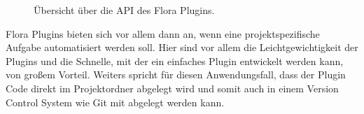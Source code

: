 \begin{figure}
    \centering
    \caption{Übersicht über die API des Flora Plugins.}
    \label{fig:FloraPluginAPI}
\end{figure}    
 
Flora Plugins bieten sich vor allem dann an, wenn eine projektspezifische 
Aufgabe automatisiert werden soll. Hier sind vor allem die 
Leichtgewichtigkeit der Plugins und die Schnelle, mit der ein 
einfaches Plugin entwickelt werden kann, von großem Vorteil. 
Weiters spricht für diesen Anwendungsfall, dass der Plugin Code 
direkt im Projektordner abgelegt wird und somit auch in einem Version 
Control System wie Git mit abgelegt werden kann.

